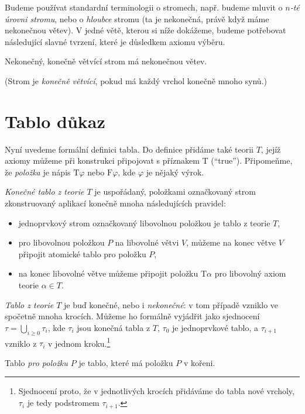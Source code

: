 Budeme používat standardní terminologii o stromech, např. budeme mluvit o \emph{$n$-té úrovni stromu}, nebo o \emph{hloubce} stromu (ta je nekonečná, právě když máme nekonečnou větev). V jedné větě, kterou si níže dokážeme, budeme potřebovat následující slavné tvrzení, které je důsledkem axiomu výběru.

\begin{lemma}
Nekonečný, konečně větvící strom má nekonečnou větev.
\end{lemma}
\noindent (Strom je \emph{konečně větvící}, pokud má každý vrchol konečně mnoho synů.)


\section{Tablo důkaz}

Nyní uvedeme formální definici tabla. Do definice přidáme také teorii $T$, jejíž axiomy můžeme při konstrukci připojovat s příznakem $\mathrm{T}$ (``true''). Připomeňme, že \emph{položka} je nápis $\mathrm{T}\varphi$ nebo $\mathrm{F}\varphi$, kde $\varphi$ je nějaký výrok.

\begin{definition}[Tablo]
\emph{Konečné tablo z teorie $T$} je uspořádaný, položkami označkovaný strom zkonstruovaný aplikací konečně mnoha následujících pravidel:
\begin{itemize}
    \item jednoprvkový strom označkovaný libovolnou položkou je tablo z teorie $T$,
    \item pro libovolnou položkou $P$ na libovolné větvi $V$, můžeme na konec větve $V$ připojit atomické tablo pro položku $P$,
    \item na konec libovolné větve můžeme připojit položku $\mathrm{T}\alpha$ pro libovolný axiom teorie $\alpha\in T$.
\end{itemize}
\emph{Tablo z teorie $T$} je buď konečné, nebo i \emph{nekonečné}: v tom případě vzniklo ve spočetně mnoha krocích. Můžeme ho formálně vyjádřit jako sjednocení $\tau=\bigcup_{i\geq 0}\tau_i$, kde $\tau_i$ jsou konečná tabla z $T$, $\tau_0$ je jednoprvkové tablo, a $\tau_{i+1}$ vzniklo z $\tau_i$ v jednom kroku.\footnote{Sjednocení proto, že v jednotlivých krocích přidáváme do tabla nové vrcholy, $\tau_i$ je tedy podstromem $\tau_{i+1}$.}

Tablo \emph{pro položku $P$} je tablo, které má položku $P$ v kořeni.
\end{definition}

